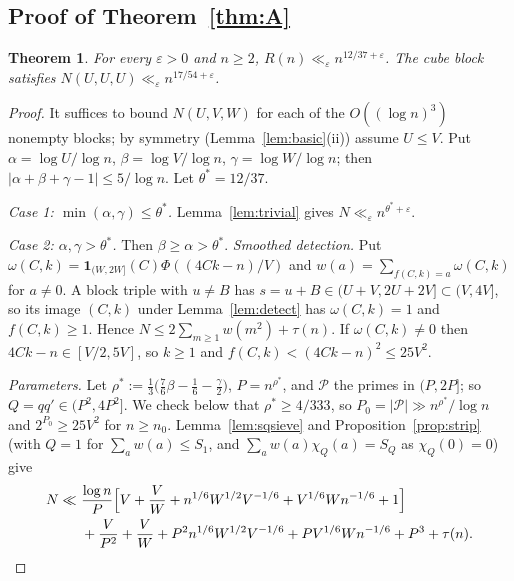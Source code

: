\documentclass[11pt,reqno]{amsart}
\newtheorem{theorem}{Theorem}[section]
\theoremstyle{definition}
\newcommand{\eps}{\varepsilon}
\newcommand{\cP}{\mathcal P}
\begin{document}
\subsection{Proof of Theorem~\ref{thm:A}}
\begin{theorem}\label{thm:main-upper}
For every $\eps>0$ and $n\ge2$, $R(n)\ll_\eps n^{12/37+\eps}$.  The cube
block satisfies $N(U,U,U)\ll_\eps n^{17/54+\eps}$.
\end{theorem}
\begin{proof}
It suffices to bound $N(U,V,W)$ for each of the $O((\log n)^3)$ nonempty
blocks; by symmetry (Lemma~\ref{lem:basic}(ii)) assume $U\le V$.  Put
$\alpha=\log U/\log n$, $\beta=\log V/\log n$, $\gamma=\log W/\log n$;
then $|\alpha+\beta+\gamma-1|\le5/\log n$.  Let $\theta^*=12/37$.

\emph{Case 1: $\min(\alpha,\gamma)\le\theta^*$.}  Lemma~\ref{lem:trivial}
gives $N\ll_\eps n^{\theta^*+\eps}$.

\emph{Case 2: $\alpha,\gamma>\theta^*$.}  Then $\beta\ge\alpha>\theta^*$.
\emph{Smoothed detection.}  Put
$\omega(C,k)=\mathbf 1_{(W,2W]}(C)\Phi((4Ck-n)/V)$ and
$w(a)=\sum_{f(C,k)=a}\omega(C,k)$ for $a\ne0$.  A block triple with
$u\ne B$ has $s=u+B\in(U+V,2U+2V]\subset(V,4V]$, so its image $(C,k)$
under Lemma~\ref{lem:detect} has $\omega(C,k)=1$ and $f(C,k)\ge1$.
Hence $N\le2\sum_{m\ge1}w(m^2)+\tau(n)$.  If $\omega(C,k)\ne0$ then
$4Ck-n\in[V/2,5V]$, so $k\ge1$ and $f(C,k)<(4Ck-n)^2\le25V^2$.

\emph{Parameters.}  Let
$\rho^*:=\frac13\bigl(\frac76\beta-\frac16-\frac\gamma2\bigr)$, $P=n^{\rho^*}$,
and $\cP$ the primes in $(P,2P]$; so $Q=qq'\in(P^2,4P^2]$.  We check
below that $\rho^*\ge4/333$, so $P_0=|\cP|\gg n^{\rho^*}/\log n$ and
$2^{P_0}\ge25V^2$ for $n\ge n_0$.  Lemma~\ref{lem:sqsieve} and
Proposition~\ref{prop:strip} (with $Q=1$ for $\sum_aw(a)\le S_1$, and
$\sum_aw(a)\chi_Q(a)=S_Q$ as $\chi_Q(0)=0$) give
\begin{align*}
 N\ll\ &\frac{\log n}{P}\Bigl[V+\frac VW+n^{1/6}W^{1/2}V^{-1/6}
 +V^{1/6}Wn^{-1/6}+1\Bigr]\\
 &+\frac V{P^2}+\frac VW+P^2n^{1/6}W^{1/2}V^{-1/6}+PV^{1/6}Wn^{-1/6}
 +P^3+\tau(n).
\end{align*}


\end{proof}
\end{document}
